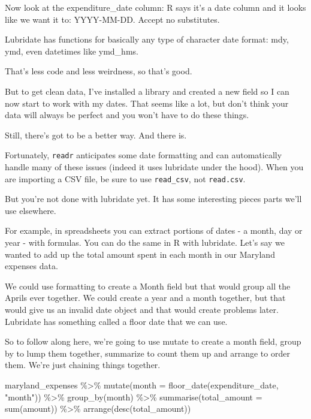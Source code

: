 \documentclass[
  letterpaper,
  DIV=11,
  numbers=noendperiod]{scrreprt}
\newenvironment{Shaded}{\begin{snugshade}}{\end{snugshade}}
\newcommand{\AttributeTok}[1]{\textcolor[rgb]{0.40,0.45,0.13}{#1}}
\newcommand{\FunctionTok}[1]{\textcolor[rgb]{0.28,0.35,0.67}{#1}}
\newcommand{\NormalTok}[1]{\textcolor[rgb]{0.00,0.23,0.31}{#1}}
\newcommand{\SpecialCharTok}[1]{\textcolor[rgb]{0.37,0.37,0.37}{#1}}
\newcommand{\StringTok}[1]{\textcolor[rgb]{0.13,0.47,0.30}{#1}}
\begin{document}
Now look at the expenditure\_date column: R says it's a date column and
it looks like we want it to: YYYY-MM-DD. Accept no substitutes.

Lubridate has functions for basically any type of character date format:
mdy, ymd, even datetimes like ymd\_hms.

That's less code and less weirdness, so that's good.

But to get clean data, I've installed a library and created a new field
so I can now start to work with my dates. That seems like a lot, but
don't think your data will always be perfect and you won't have to do
these things.

Still, there's got to be a better way. And there is.

Fortunately, \texttt{readr} anticipates some date formatting and can
automatically handle many of these issues (indeed it uses lubridate
under the hood). When you are importing a CSV file, be sure to use
\texttt{read\_csv}, not \texttt{read.csv}.

But you're not done with lubridate yet. It has some interesting pieces
parts we'll use elsewhere.

For example, in spreadsheets you can extract portions of dates - a
month, day or year - with formulas. You can do the same in R with
lubridate. Let's say we wanted to add up the total amount spent in each
month in our Maryland expenses data.

We could use formatting to create a Month field but that would group all
the Aprils ever together. We could create a year and a month together,
but that would give us an invalid date object and that would create
problems later. Lubridate has something called a floor date that we can
use.

So to follow along here, we're going to use mutate to create a month
field, group by to lump them together, summarize to count them up and
arrange to order them. We're just chaining things together.

\begin{Shaded}
\begin{Highlighting}[]
\NormalTok{maryland\_expenses }\SpecialCharTok{\%\textgreater{}\%}
  \FunctionTok{mutate}\NormalTok{(}\AttributeTok{month =} \FunctionTok{floor\_date}\NormalTok{(expenditure\_date, }\StringTok{"month"}\NormalTok{)) }\SpecialCharTok{\%\textgreater{}\%}
  \FunctionTok{group\_by}\NormalTok{(month) }\SpecialCharTok{\%\textgreater{}\%}
  \FunctionTok{summarise}\NormalTok{(}\AttributeTok{total\_amount =} \FunctionTok{sum}\NormalTok{(amount)) }\SpecialCharTok{\%\textgreater{}\%}
  \FunctionTok{arrange}\NormalTok{(}\FunctionTok{desc}\NormalTok{(total\_amount))}
\end{Highlighting}
\end{Shaded}
\end{document}
